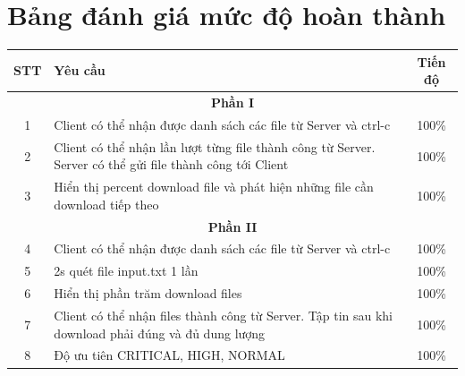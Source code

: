 \documentclass[a4paper,12pt]{report}
\begin{document}
\section{Bảng đánh giá mức độ hoàn thành}
\begin{center}
  \renewcommand{\arraystretch}{1.5}
  \begin{tabular}{|c|p{}|c|}
    \hline
    \textbf{STT} & \textbf{Yêu cầu}                                                                                         & \textbf{Tiến độ}                        \\\hline
    \multicolumn{3}{|c|}{\textbf{Phần I}}                                                                                                                                                \\\hline
    1            & Client có thể nhận được danh sách các file từ Server và ctrl-c                                           & 100\%             \\\hline
    2            & Client có thể nhận lần lượt từng file thành công từ Server. Server có thể gửi file thành công tới Client & 100\%             \\\hline
    3            & Hiển thị percent download file và phát hiện những file cần download tiếp theo                            & 100\%             \\\hline
    \multicolumn{3}{|c|}{\textbf{Phần II}}                                                                                                                                               \\\hline
    4            & Client có thể nhận được danh sách các file từ Server và ctrl-c                                           & 100\%             \\\hline
    5            & 2s quét file input.txt 1 lần                                                                             & 100\%             \\\hline
    6            & Hiển thị phần trăm download files                                                                       & 100\%             \\\hline
    7            & Client có thể nhận files thành công từ Server. Tập tin sau khi download phải đúng và đủ dung lượng       & 100\%             \\\hline
    8            & Độ ưu tiên CRITICAL, HIGH, NORMAL                                                                        & 100\%             \\\hline

\end{tabular}
\end{center}
\end{document}
